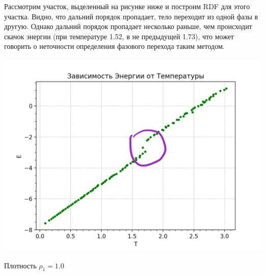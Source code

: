 \newpage

Рассмотрим участок, выделенный на рисунке ниже и построим RDF для этого участка. Видно, что дальний порядок пропадает, тело переходит из одной фазы в другую. Однако дальний порядок пропадает несколько раньше, чем происходит скачок энергии (при температуре 1.52, в не предыдущей 1.73), что может говорить о неточности определения фазового перехода таким методом. 


\begin{center}
        \includegraphics[width=0.5\linewidth]{5.png}\\
        \end{center}
\begin{center}
        Плотность $\rho_1 = 1.0$
\end{center}

